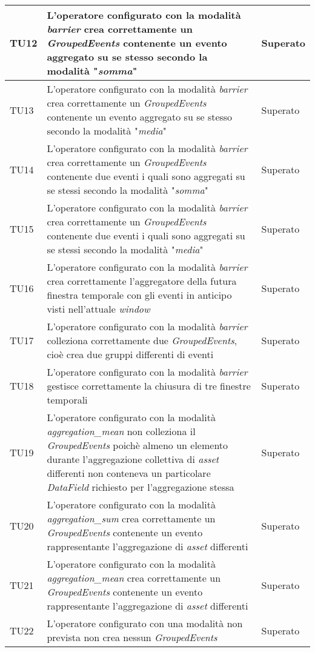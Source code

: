 {\begin{longtable}{L{3cm} L{8.5cm} L{2cm}}
\hline
TU12 & L'operatore configurato con la modalità \textit{barrier} crea correttamente un \textit{GroupedEvents} contenente un evento aggregato su se stesso secondo la modalità "\textit{somma}" & Superato \\
\hline
TU13 & L'operatore configurato con la modalità \textit{barrier} crea correttamente un \textit{GroupedEvents} contenente un evento aggregato su se stesso secondo la modalità "\textit{media}" & Superato \\
\hline
TU14 & L'operatore configurato con la modalità \textit{barrier} crea correttamente un \textit{GroupedEvents} contenente due eventi i quali sono aggregati su se stessi secondo la modalità "\textit{somma}" & Superato \\
\hline
TU15 & L'operatore configurato con la modalità \textit{barrier} crea correttamente un \textit{GroupedEvents} contenente due eventi i quali sono aggregati su se stessi secondo la modalità "\textit{media}" & Superato \\
\hline
TU16 & L'operatore configurato con la modalità \textit{barrier} crea correttamente l'aggregatore della futura finestra temporale con gli eventi in anticipo visti nell'attuale \textit{window} & Superato \\
\hline
TU17 & L'operatore configurato con la modalità \textit{barrier} colleziona correttamente due \textit{GroupedEvents}, cioè crea due gruppi differenti di eventi & Superato \\
\hline
TU18 & L'operatore configurato con la modalità \textit{barrier} gestisce correttamente la chiusura di tre finestre temporali & Superato \\
\hline
TU19 & L'operatore configurato con la modalità \textit{aggregation\_mean} non colleziona il \textit{GroupedEvents} poichè almeno un elemento durante l'aggregazione collettiva di \textit{asset} differenti non conteneva un particolare \textit{DataField} richiesto per l'aggregazione stessa & Superato \\
\hline
TU20 & L'operatore configurato con la modalità \textit{aggregation\_sum} crea correttamente un \textit{GroupedEvents} contenente un evento rappresentante l'aggregazione di \textit{asset} differenti & Superato \\
\hline
TU21 & L'operatore configurato con la modalità \textit{aggregation\_mean} crea correttamente un \textit{GroupedEvents} contenente un evento rappresentante l'aggregazione di \textit{asset} differenti & Superato \\
\hline
TU22 & L'operatore configurato con una modalità non prevista non crea nessun \textit{GroupedEvents} & Superato \\
\hline
\end{longtable}
}



